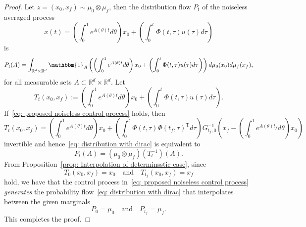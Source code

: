 \documentclass[10pt,a4paper]{amsart}
\newcommand{\R}{\mathbb{R}}
\begin{document}
\begin{proof}
Let $z=(x_0,x_f)\sim\mu_0\otimes\mu_f$,  then the distribution flow $P_t$ of the noiseless averaged process 
\begin{equation}\label{eq: noiseless averaged process}
x(t)=\left(\int_0^1e^{A(\theta)t}d\theta\right) x_0+\left(\int_{0}^{t}\Phi(t,\tau)u(\tau)d\tau\right) 
\end{equation}
is 
\begin{equation}\label{eq: distribution with dirac}
P_t(A)=\int_{\R^d\times\R^d}\mathbbm{1}_A\left(\left(\int_0^1e^{A(\theta)t}d\theta\right) x_0+\left(\int_{0}^{t}\Phi(t,\tau)u(\tau)d\tau\right)\right)d\mu_0(x_0)d\mu_f(x_f),    
\end{equation}
for all measurable sets $A\subset\R^d\times\R^d$. Let 
\[
T_t(x_0,x_f):=\left(\int_0^1e^{A(\theta)t}d\theta\right) x_0+\left(\int_{0}^{t}\Phi(t,\tau)u(\tau)d\tau\right). 
\]
If~\eqref{eq: proposed noiseless control process} holds, then %
\[
T_t(x_0,x_f)=\left(\int_0^1e^{A(\theta)t}d\theta\right) x_0+\left(\int_{0}^{t}\Phi(t,\tau)\Phi(t_f,\tau)^{\mathrm{T}}d\tau\right) G_{t_f,0}^{-1}\left(x_f-\left(\int_{0}^{1}e^{A(\theta)t_f}d\theta\right) x_0\right)
\]
invertible and hence~\eqref{eq: distribution with dirac} is equivalent to 
\begin{equation}\label{eq: distribution flow}
P_t(A)=(\mu_0\otimes\mu_f)(T_{t}^{-1})(A).
\end{equation}
From Proposition~\ref{prop: Interpolation of determinsstic case}, since
\[
T_0(x_0,x_f)=x_0\quad\text{and}\quad T_{t_f}(x_0,x_f)=x_f
\]
hold, we have that  the control process in~\eqref{eq: proposed noiseless control process} \emph{generates} the probability flow~\eqref{eq: distribution with dirac} that interpolates between the given marginals  
\[
P_0=\mu_0\quad\text{and}\quad P_{t_f}=\mu_f.
\]
This completes the proof.
\end{proof}
\end{document}
